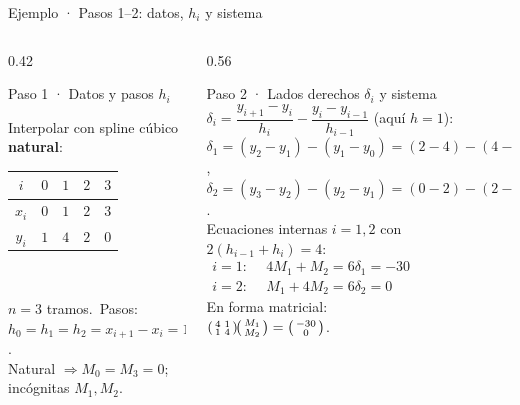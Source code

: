 \documentclass[aspectratio=169,10pt]{beamer}
\begin{document}
\begin{frame}{Ejemplo · Pasos 1--2: datos, $h_i$ y sistema}
\begin{columns}[T]
\begin{column}{0.42\textwidth}
\begin{cardidea}{Paso 1 · Datos y pasos $h_i$}{\faListOl}
{\footnotesize Interpolar con spline cúbico \textbf{natural}:\\[0.8mm]
\centering
\renewcommand{\arraystretch}{1.15}\setlength{\tabcolsep}{7pt}
\begin{tabular}{c|cccc}
$i$ & $0$ & $1$ & $2$ & $3$\\\hline
$x_i$ & $0$ & $1$ & $2$ & $3$\\
$y_i$ & $1$ & $4$ & $2$ & $0$\\
\end{tabular}\\[1.0mm]
\raggedright
$n=3$ tramos.\ Pasos:\\[0.2mm]
$h_0=h_1=h_2=x_{i+1}-x_i=1$.\\[0.6mm]
Natural $\Rightarrow M_0=M_3=0$; incógnitas $M_1,M_2$.}
\end{cardidea}
\end{column}
\begin{column}{0.56\textwidth}
\begin{cardgear}{Paso 2 · Lados derechos $\delta_i$ y sistema}{\faCalculator}
{\footnotesize $\delta_i=\dfrac{y_{i+1}-y_i}{h_i}-\dfrac{y_i-y_{i-1}}{h_{i-1}}$ (aquí $h=1$):\\[0.8mm]
$\delta_1=(y_2-y_1)-(y_1-y_0)=(2-4)-(4-1)=-5$,\\[0.4mm]
$\delta_2=(y_3-y_2)-(y_2-y_1)=(0-2)-(2-4)=0$.\\[1.0mm]
Ecuaciones internas $i=1,2$ con $2(h_{i-1}{+}h_i)=4$:\\[0.6mm]
$\begin{aligned}
i{=}1:&\ \ 4M_1+M_2=6\delta_1=-30\\
i{=}2:&\ \ M_1+4M_2=6\delta_2=0
\end{aligned}$\\[1.0mm]
En forma matricial:\\[0.4mm]
$\begin{psmallmatrix}4&1\\ 1&4\end{psmallmatrix}\!\begin{psmallmatrix}M_1\\ M_2\end{psmallmatrix}=\begin{psmallmatrix}-30\\ 0\end{psmallmatrix}$.}

\end{cardgear}
\end{column}
\end{columns}
\end{frame}
\end{document}
